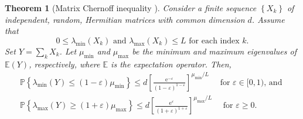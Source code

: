 \documentclass[twoside,12pt]{article}
\newtheorem{theorem}{Theorem}
\newtheorem{lemma}{Lemma}
\newcommand{\lx}[1]{\textcolor{pink}{#1}}
\begin{document}

\begin{theorem}[Matrix Chernoff inequality 
\cite{Tropp2010UserFriendly}]  \label{chernoff}Consider a finite sequence $\left\{X_k\right\}$ of independent, random, Hermitian matrices with common dimension $d$. Assume that
$$
0 \leq \lambda_{\min }\left(X_k\right) \text { and } \lambda_{\max }\left(X_k\right) \leq L \text { for each index } k .
$$
Set $Y=\sum_k X_k$. Let $\mu_{\operatorname{min}}$ and   $\mu_{\max }$ be the minimum and maximum eigenvalues of $\mathbb{E}(Y)$, respectively, where $\mathbb{E}$ is the expectation operator. Then,
$$
\begin{array}{l}
\mathbb{P}\left\{\lambda_{\min }(Y) \leq(1-\varepsilon) \mu_{\min }\right\} \leq d\left[\frac{\mathrm{e}^{-\varepsilon}}{(1-\varepsilon)^{1-\varepsilon}}\right]^{\mu_{\min } / L} \quad \text { for } \varepsilon \in[0,1) \text {, and } \\
\mathbb{P}\left\{\lambda_{\max }(Y) \geq(1+\varepsilon) \mu_{\max }\right\} \leq d\left[\frac{\mathrm{e}^{\varepsilon}}{(1+\varepsilon)^{1+\varepsilon}}\right]^{\mu_{\max } / L} \quad \text { for } \varepsilon \geq 0. \\
\end{array}
$$
\end{theorem}
\end{document}
